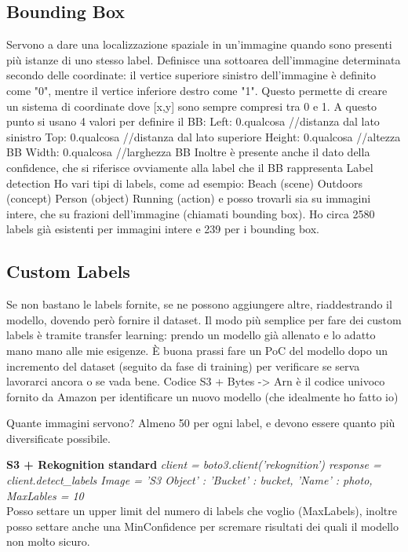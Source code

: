 \documentclass{classes/base}
\begin{document}
    \subsection*{Bounding Box}
    Servono a dare una localizzazione spaziale in un'immagine quando sono presenti più istanze di uno stesso label.
    Definisce una sottoarea dell'immagine determinata secondo delle coordinate: il vertice superiore sinistro dell'immagine è definito come "0", mentre il vertice inferiore destro come "1". 
    Questo permette di creare un sistema di coordinate dove [x,y] sono sempre compresi tra 0 e 1.
    A questo punto si usano 4 valori per definire il BB: 
    Left: 0.qualcosa //distanza dal lato sinistro
    Top: 0.qualcosa //distanza dal lato superiore
    Height: 0.qualcosa //altezza BB
    Width: 0.qualcosa //larghezza BB
    Inoltre è presente anche il dato della confidence, che si riferisce ovviamente alla label che il BB rappresenta
    Label detection
    Ho vari tipi di labels, come ad esempio: 
    Beach (scene)
    Outdoors (concept)
    Person (object)
    Running (action)
    e posso trovarli sia su immagini intere, che su frazioni dell'immagine (chiamati bounding box). 
    Ho circa 2580 labels già esistenti per immagini intere e 239 per i bounding box.

    \subsection*{Custom Labels}
    Se non bastano le labels fornite, se ne possono aggiungere altre, riaddestrando il modello, dovendo però fornire il dataset.
    Il modo più semplice per fare dei custom labels è tramite transfer learning: prendo un modello già allenato e lo adatto mano mano alle mie esigenze.
    È buona prassi fare un PoC del modello dopo un incremento del dataset (seguito da fase di training) per verificare se serva lavorarci ancora o se vada bene.
    Codice
    S3 + Bytes -> Arn è il codice univoco fornito da Amazon per identificare un nuovo modello (che idealmente ho fatto io)

    Quante immagini servono? Almeno 50 per ogni label, e devono essere quanto più diversificate possibile.

    \textbf{S3 + Rekognition standard}
    \textit{client = boto3.client('rekognition')   
    response = client.detect_labels{
                                Image = {'S3 Object' : { 'Bucket' : bucket,
                                                        'Name' : photo}},
                                                    MaxLables = 10}} \\
    Posso settare un upper limit del numero di labels che voglio (MaxLabels), inoltre posso settare anche una MinConfidence per scremare risultati dei quali il modello non  molto sicuro.\\
\end{document}
